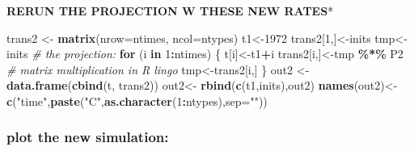 \documentclass[
]{article}
\newenvironment{Shaded}{\begin{snugshade}}{\end{snugshade}}
\newcommand{\AttributeTok}[1]{\textcolor[rgb]{0.13,0.29,0.53}{#1}}
\newcommand{\CommentTok}[1]{\textcolor[rgb]{0.56,0.35,0.01}{\textit{#1}}}
\newcommand{\ControlFlowTok}[1]{\textcolor[rgb]{0.13,0.29,0.53}{\textbf{#1}}}
\newcommand{\DecValTok}[1]{\textcolor[rgb]{0.00,0.00,0.81}{#1}}
\newcommand{\FunctionTok}[1]{\textcolor[rgb]{0.13,0.29,0.53}{\textbf{#1}}}
\newcommand{\NormalTok}[1]{#1}
\newcommand{\OtherTok}[1]{\textcolor[rgb]{0.56,0.35,0.01}{#1}}
\newcommand{\SpecialCharTok}[1]{\textcolor[rgb]{0.81,0.36,0.00}{\textbf{#1}}}
\newcommand{\StringTok}[1]{\textcolor[rgb]{0.31,0.60,0.02}{#1}}
\begin{document}
\textbf{RERUN THE PROJECTION W THESE NEW RATES}*

\begin{Shaded}
\begin{Highlighting}[]
\NormalTok{trans2 }\OtherTok{\textless{}{-}} \FunctionTok{matrix}\NormalTok{(}\AttributeTok{nrow=}\NormalTok{ntimes, }\AttributeTok{ncol=}\NormalTok{ntypes)}
\NormalTok{t1}\OtherTok{\textless{}{-}}\DecValTok{1972}
\NormalTok{trans2[}\DecValTok{1}\NormalTok{,]}\OtherTok{\textless{}{-}}\NormalTok{inits}
\NormalTok{tmp}\OtherTok{\textless{}{-}}\NormalTok{inits}
\CommentTok{\# the projection:}
\ControlFlowTok{for}\NormalTok{ (i }\ControlFlowTok{in} \DecValTok{1}\SpecialCharTok{:}\NormalTok{ntimes) \{}
\NormalTok{    t[i]}\OtherTok{\textless{}{-}}\NormalTok{t1}\SpecialCharTok{+}\NormalTok{i}
\NormalTok{    trans2[i,]}\OtherTok{\textless{}{-}}\NormalTok{tmp }\SpecialCharTok{\%*\%}\NormalTok{ P2 }\CommentTok{\# matrix multiplication in R lingo}
\NormalTok{    tmp}\OtherTok{\textless{}{-}}\NormalTok{trans2[i,]}
\NormalTok{\}}
\NormalTok{out2 }\OtherTok{\textless{}{-}} \FunctionTok{data.frame}\NormalTok{(}\FunctionTok{cbind}\NormalTok{(t, trans2))}
\NormalTok{out2}\OtherTok{\textless{}{-}} \FunctionTok{rbind}\NormalTok{(}\FunctionTok{c}\NormalTok{(t1,inits),out2)}
\FunctionTok{names}\NormalTok{(out2)}\OtherTok{\textless{}{-}}\FunctionTok{c}\NormalTok{(}\StringTok{"time"}\NormalTok{,}\FunctionTok{paste}\NormalTok{(}\StringTok{"C"}\NormalTok{,}\FunctionTok{as.character}\NormalTok{(}\DecValTok{1}\SpecialCharTok{:}\NormalTok{ntypes),}\AttributeTok{sep=}\StringTok{""}\NormalTok{))}
\end{Highlighting}
\end{Shaded}

\subsubsection{plot the new simulation:}\label{plot-the-new-simulation}
\end{document}
